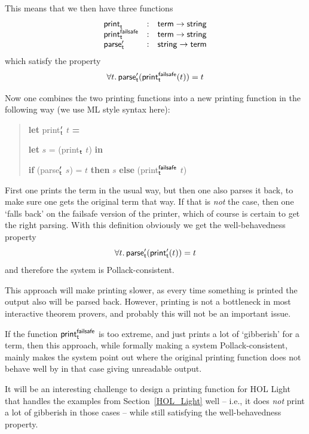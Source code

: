\documentclass{entcs}
\begin{document}
This means that we then have three functions
$$
\begin{array}{lcl}
{\sf print}_{\sf t} &:& {\sf term} \to {\sf string} \\
{\sf print}_{\sf t}^{\sf failsafe} &:& {\sf term} \to {\sf string} \\
{\sf parse}'_{\sf t} &:& {\sf string} \to {\sf term}
\end{array}
$$
which satisfy the property
$$\forall t.\,{\sf parse}'_{\sf t}({\sf print}_{\sf t}^{\sf failsafe}(t)) = t$$

\noindent
Now one combines the two printing functions into a new printing function
in the following way (we use {\small ML} style syntax here):
\begin{quote}\sf
\medskip
\strut \textbf{let} print$'_{\sf t}$ $t$ \textbf{=} \\
\strut\quad\textbf{let} $s$ = (print$_{\sf t}$ $t$) \textbf{in} \\
\strut\quad\textbf{if} (parse$'_{\sf t}$ $s$) = $t$ %
\textbf{then} $s$ %
\textbf{else} (print$_{\sf t}^{\sf failsafe}$ $t$)
\medskip
\end{quote}
First one prints the term in the usual way, but then one also parses
it back, to make sure one gets the original term that way.
If that is \emph{not} the case, then one `falls back' on the
failsafe version of the printer, which of course is certain to
get the right parsing.
With this definition obviously we get the well-behavedness property
$$\forall t.\,{\sf parse}'_{\sf t}({\sf print}'_{\sf t}(t)) = t$$
and therefore the system is Pollack-consistent.

This approach will make printing slower, as every time something is printed
the output also will be parsed back.
However, printing is not a bottleneck in most interactive theorem
provers, and probably this will not be an important issue.

If the function ${\sf print}_{\sf t}^{\sf failsafe}$ is too extreme,
and just prints a lot of `gibberish' for a term, then this approach, while formally
making a system Pollack-consistent, mainly makes the system point
out where the original printing function does not behave well
by in that case giving unreadable output.

It will be an interesting challenge to design a printing function for
{\small HOL} Light that handles the examples from Section~\ref{HOL_Light}
well -- i.e., it does \emph{not} print a lot of gibberish in those cases -- while still
satisfying the well-behavedness property.
\end{document}
